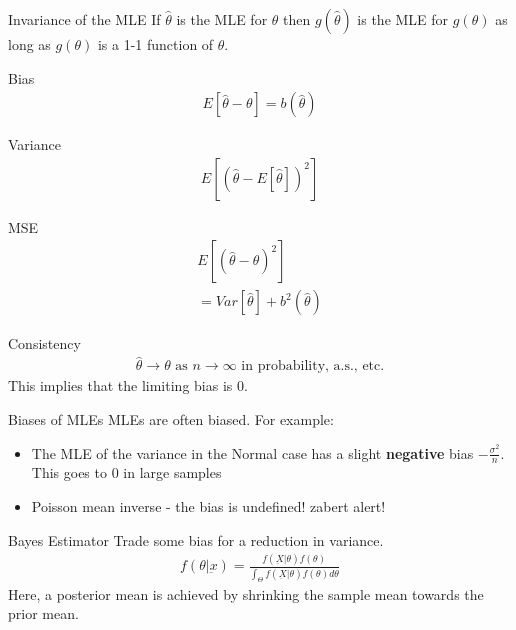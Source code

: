 \documentclass[avery5388,grid,frame]{flashcards}
\begin{document}
 \begin{flashcard}[Definition]{Invariance of the MLE}
 \bigskip\bigskip\bigskip\bigskip
If $\hat{\theta}$ is the MLE for $\theta$ then $g(\hat{\theta})$ is the MLE for $g(\theta)$ as long as $g(\theta)$ is a 1-1 function of $\theta$.
\end{flashcard}
 \begin{flashcard}[Definition]{Bias}
 \bigskip\bigskip\bigskip
{\begin{align*}
E[\hat{\theta}-\theta]=b(\hat{\theta})
\end{align*}}
\end{flashcard}
 \begin{flashcard}[Definition]{Variance}
 \bigskip\bigskip\bigskip
{\begin{align*}
E[(\hat{\theta} -E[\hat{\theta}])^2]
\end{align*}}
\end{flashcard}
 \begin{flashcard}[Definition]{MSE}
 \bigskip\bigskip\bigskip
{\begin{align*}
E[(\hat{\theta}-\theta)^2]\\
=Var[\hat{\theta}]+b^2(\hat{\theta})
\end{align*}}
\end{flashcard}
 \begin{flashcard}[Definition]{Consistency}
 \bigskip\bigskip\bigskip
{\begin{align*}
\hat{\theta}\rightarrow\theta \textrm{ as } n\rightarrow\infty \textrm{ in probability, a.s., etc.}
\end{align*}}
This implies that the limiting bias is 0.
\end{flashcard}
 \begin{flashcard}[Definition]{Biases of MLEs}
 \bigskip\bigskip\bigskip
MLEs are often biased. For example:
\begin{itemize}
\item The MLE of the variance in the Normal case has a slight \textbf{negative} bias $-\frac{\sigma^2}{n}$. This goes to 0 in large samples
\item Poisson mean inverse - the bias is undefined! zabert alert!
\end{itemize}
\end{flashcard}
 \begin{flashcard}[Definition]{Bayes Estimator}
 \bigskip\bigskip\bigskip
Trade some bias for a reduction in variance.
{\begin{align*}
f(\theta|\underbar{x})=\frac{f(\underbar{X}|\theta)f(\theta)}{\int_{\Theta}f(\underbar{X}|\theta)f(\theta)d\theta}
\end{align*}}
Here, a posterior mean is achieved by shrinking the sample mean towards the prior mean.
\end{flashcard}
\end{document}
